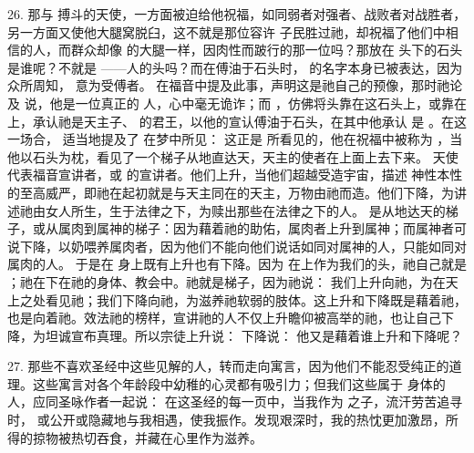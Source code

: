 26. 那与  搏斗的天使，一方面被迫给他祝福，如同弱者对强者、战败者对战胜者，另一方面又使他大腿窝脱臼，这不就是那位容许  子民胜过祂，却祝福了他们中相信的人，而群众却像  的大腿一样，因肉性而跛行的那一位吗？那放在  头下的石头是谁呢？不就是 ——人的头吗？而在傅油于石头时， 的名字本身已被表达，因为众所周知， 意为受傅者。 在福音中提及此事，声明这是祂自己的预像，那时祂论及  说，他是一位真正的  人，心中毫无诡诈；而 ，仿佛将头靠在这石头上，或靠在  上，承认祂是天主子、 的君王，以他的宣认傅油于石头，在其中他承认  是 。在这一场合， 适当地提及了  在梦中所见： 这正是  所看见的，他在祝福中被称为 ，当他以石头为枕，看见了一个梯子从地直达天，天主的使者在上面上去下来。 天使代表福音宣讲者，或  的宣讲者。他们上升，当他们超越受造宇宙，描述  神性本性的至高威严，即祂在起初就是与天主同在的天主，万物由祂而造。他们下降，为讲述祂由女人所生，生于法律之下，为赎出那些在法律之下的人。 是从地达天的梯子，或从属肉到属神的梯子：因为藉着祂的助佑，属肉者上升到属神；而属神者可说下降，以奶喂养属肉者，因为他们不能向他们说话如同对属神的人，只能如同对属肉的人。 于是在  身上既有上升也有下降。因为  在上作为我们的头，祂自己就是 ；祂在下在祂的身体、教会中。祂就是梯子，因为祂说： 我们上升向祂，为在天上之处看见祂；我们下降向祂，为滋养祂软弱的肢体。这上升和下降既是藉着祂，也是向着祂。效法祂的榜样，宣讲祂的人不仅上升瞻仰被高举的祂，也让自己下降，为坦诚宣布真理。所以宗徒上升说： 下降说： 他又是藉着谁上升和下降呢？\par

27. 那些不喜欢圣经中这些见解的人，转而走向寓言，因为他们不能忍受纯正的道理。这些寓言对各个年龄段中幼稚的心灵都有吸引力；但我们这些属于  身体的人，应同圣咏作者一起说： 在这圣经的每一页中，当我作为  之子，流汗劳苦追寻时， 或公开或隐藏地与我相遇，使我振作。发现艰深时，我的热忱更加激昂，所得的掠物被热切吞食，并藏在心里作为滋养。\par

